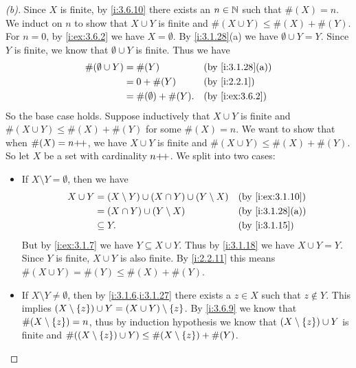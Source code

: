 \begin{proof}[(b)]
  Since \(X\) is finite, by \cref{i:3.6.10} there exists an \(n \in \mathbb{N}\) such that \(\#(X) = n\).
  We induct on \(n\) to show that \(X \cup Y\) is finite and \(\#(X \cup Y) \leq \#(X) + \#(Y)\).
  For \(n = 0\), by \cref{i:ex:3.6.2} we have \(X = \emptyset\).
  By \cref{i:3.1.28}(a) we have \(\emptyset \cup Y = Y\).
  Since \(Y\) is finite, we know that \(\emptyset \cup Y\) is finite.
  Thus we have
  \begin{align*}
    \#(\emptyset \cup Y) & = \#(Y)                  &  & \by{i:3.1.28}[a] \\
                         & = 0 + \#(Y)              &  & \by{i:2.2.1}     \\
                         & = \#(\emptyset) + \#(Y). &  & \by{i:ex:3.6.2}
  \end{align*}
  So the base case holds.
  Suppose inductively that \(X \cup Y\) is finite and \(\#(X \cup Y) \leq \#(X) + \#(Y)\) for some \(\#(X) = n\).
  We want to show that when \(\#(X) = n{+}\!{+}\), we have \(X \cup Y\) is finite and \(\#(X \cup Y) \leq \#(X) + \#(Y)\).
  So let \(X\) be a set with cardinality \(n{+}\!{+}\).
  We split into two cases:
  \begin{itemize}
    \item If \(X \setminus Y = \emptyset\), then we have
          \begin{align*}
            X \cup Y & = (X \setminus Y) \cup (X \cap Y) \cup (Y \setminus X) &  & \by{i:ex:3.1.10} \\
                     & = (X \cap Y) \cup (Y \setminus X)                      &  & \by{i:3.1.28}[a] \\
                     & \subseteq Y.                                           &  & \by{i:3.1.15}
          \end{align*}
          But by \cref{i:ex:3.1.7} we have \(Y \subseteq X \cup Y\).
          Thus by \cref{i:3.1.18} we have \(X \cup Y = Y\).
          Since \(Y\) is finite, \(X \cup Y\) is also finite.
          By \cref{i:2.2.11} this means \(\#(X \cup Y) = \#(Y) \leq \#(X) + \#(Y)\).
    \item If \(X \setminus Y \neq \emptyset\), then by \cref{i:3.1.6,i:3.1.27} there exists a \(z \in X\) such that \(z \notin Y\).
          This implies \((X \setminus \left\lbrace z\right\rbrace) \cup Y = (X \cup Y) \setminus \left\lbrace z\right\rbrace\).
          By \cref{i:3.6.9} we know that \(\#(X \setminus \left\lbrace z\right\rbrace) = n\), thus by induction hypothesis we know that \((X \setminus \left\lbrace z\right\rbrace) \cup Y\) is finite and \(\#((X \setminus \left\lbrace z\right\rbrace) \cup Y) \leq \#(X \setminus \left\lbrace z\right\rbrace) + \#(Y)\).

\end{itemize}
\end{proof}
